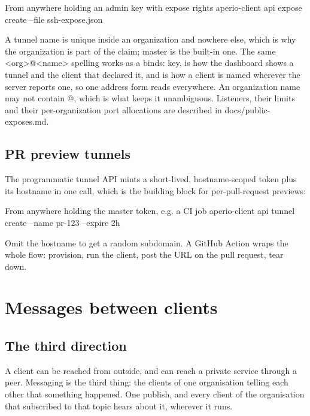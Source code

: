 \documentclass[11pt,a4paper,oneside]{book}
\newcommand{\aperiobreakableunderscore}{\textunderscore\allowbreak}
\newcommand{\aperiocodebreaks}{\XeTeXinterchartokenstate=1 }
\newcommand{\aperiocodebreaks}{}
\DeclareRobustCommand{\code}[1]{{\ttfamily\small\aperiocodebreaks
  \let\_\aperiobreakableunderscore#1}}
\begin{document}
\begin{codecard}[aperiosh]{From anywhere holding an admin key with expose rights}
aperio-client api expose create --file ssh-expose.json
\end{codecard}

A tunnel name is unique inside an organization and nowhere else, which is
why the organization is part of the claim; \code{master} is the built-in
one. The same \code{<org>@<name>} spelling works as a
\code{binds:} key, is how the dashboard shows a tunnel and the
client that declared it, and is how a client is named wherever the
server reports one, so one address form reads everywhere. An organization name may not contain
\code{@}, which is what keeps it unambiguous. Listeners, their limits and
their per-organization port allocations are described in
\code{docs/public-exposes.md}.

\section{PR preview tunnels}

The programmatic tunnel API mints a short-lived, hostname-scoped token
plus its hostname in one call, which is the building block for per-pull-request
previews:

\begin{codecard}[aperiosh]{From anywhere holding the master token, e.g. a CI job}
aperio-client api tunnel create --name pr-123 --expire 2h
\end{codecard}

Omit the hostname to get a random subdomain. A GitHub Action wraps the
whole flow: provision, run the client, post the URL on the pull request,
tear down.

\chapter{Messages between clients}
\label{ch:messaging}

\section{The third direction}

A client can be reached from outside, and can reach a private service
through a peer. Messaging is the third thing: the clients of one
organisation telling each other that something happened. One publish, and
every client of the organisation that subscribed to that topic hears
about it, wherever it runs.
\end{document}
